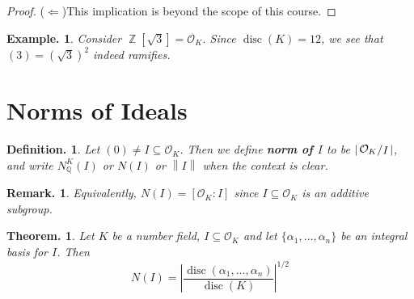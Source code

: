 \documentclass[11pt, a4paper]{memoir}
\DeclareMathOperator{\Q}{{\mathbb{Q}}}
\DeclareMathOperator{\Z}{{\mathbb{Z}}}
\newcommand{\impl}{{($\Leftarrow$)\hspace{0.2cm}}}
\newcommand{\norm}[1]{\ensuremath{\left\lVert#1\right\rVert}}
\theoremstyle{change}
\newtheorem{theorem}{Theorem.}[section]
\theoremstyle{plain}
\theoremstyle{nonumberplain}
\newtheorem{definition}{Definition.}
\newtheorem{example}{Example.}
\newtheorem{remark}{Remark.}
\newtheorem{proof}{Proof}
\DeclareMathOperator{\disc}{disc}
\newcommand{\quot}[2]{\mathchoice{\left.\raisebox{0.13em}{$#1$}\middle/\raisebox{-0.13em}{$#2$}\right.}
                                 {\left.\raisebox{0.07em}{$#1$}\middle/\raisebox{-0.07em}{$#2$}\right.}
                                 {\left.\raisebox{0.03em}{$#1$}\middle/\raisebox{-0.03em}{$#2$}\right.}
                                 {\left.\raisebox{0em}{$#1$}\middle/\raisebox{0em}{$#2$}\right.}}
\newcommand{\mbf}[1]{{\boldmath\bfseries #1}}
\numberwithin{equation}{section}
\begin{document}
\begin{proof}
    \impl This implication is beyond the scope of this course.
\end{proof}
\begin{example}
    Consider $\Z[\sqrt{3}]=\mathcal{O}_K$.
    Since $\disc(K)=12$, we see that $(3)=(\sqrt{3})^2$ indeed ramifies.
\end{example}

\section{Norms of Ideals}
\begin{definition}
    Let $(0)\neq I\subseteq\mathcal{O}_K$.
    Then we define \mbf{norm of $I$} to be $\left\lvert\quot{\mathcal{O}_K}{I}\right\rvert$, and write $N_{\Q}^K(I)$ or $N(I)$ or $\norm{I}$ when the context is clear.
\end{definition}
\begin{remark}
    Equivalently, $N(I)=[\mathcal{O}_K:I]$ since $I\subseteq\mathcal{O}_K$ is an additive subgroup.
\end{remark}
\begin{theorem}\label{thm:id-norm}
    Let $K$ be a number field, $I\subseteq\mathcal{O}_K$ and let $\{\alpha_1,\ldots,\alpha_n\}$ be an integral basis for $I$.
    Then
    \begin{equation*}
        N(I)=\left\lvert\frac{\disc(\alpha_1,\ldots,\alpha_n)}{\disc(K)}\right\rvert^{1/2}
    \end{equation*}
\end{theorem}
\end{document}
